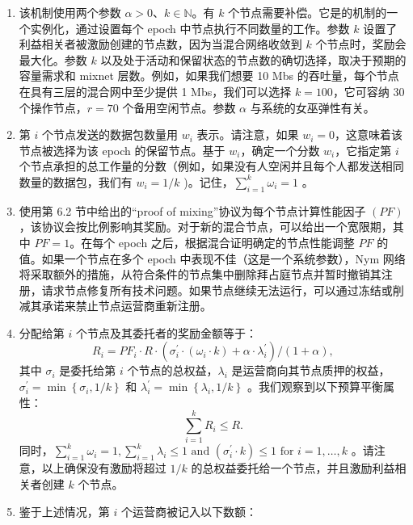 \documentclass{article}
\begin{document}
\begin{enumerate}[1. ]
\item 该机制使用两个参数 $\alpha > 0$、$k \in \mathbb{N}$。有 $k$ 个节点需要补偿。它是\cite{ref10}的机制的一个实例化，通过设置每个 epoch 中节点执行不同数量的工作。参数 $k$ 设置了利益相关者被激励创建的节点数，因为当混合网络收敛到 $k$ 个节点时，奖励会最大化。参数 $k$ 以及处于活动和保留状态的节点数的确切选择，取决于预期的容量需求和 mixnet 层数。例如，如果我们想要 10 Mbs 的吞吐量，每个节点在具有三层的混合网中至少提供 1 Mbs，我们可以选择 $k = 100$，它可容纳 30 个操作节点，$r = 70$ 个备用空闲节点。参数 $\alpha$ 与系统的女巫弹性有关。
\item 第 $i$ 个节点发送的数据包数量用 $w_{i}$ 表示。请注意，如果 $w_{i} = 0$，这意味着该节点被选择为该 epoch 的保留节点。基于 $w_{i}$，确定一个分数 $w_{i}$，它指定第 $i$ 个节点承担的总工作量的分数（例如，如果没有人空闲并且每个人都发送相同数量的数据包，我们有 $w_{i} = 1/k$ )。记住，$\sum_{i=1}^{k} \omega_{i}=1$ 。
\item 使用第 6.2 节中给出的“proof of mixing”协议为每个节点计算性能因子 $(PF )$，该协议会按比例影响其奖励。对于新的混合节点，可以给出一个宽限期，其中 $PF = 1$。在每个 epoch 之后，根据混合证明确定的节点性能调整 $PF$ 的值。如果一个节点在多个 epoch 中表现不佳（这是一个系统参数），Nym 网络将采取额外的措施，从符合条件的节点集中删除拜占庭节点并暂时撤销其注册，请求节点修复所有技术问题。如果节点继续无法运行，可以通过冻结或削减其承诺来禁止节点运营商重新注册。
\item 分配给第 $i$ 个节点及其委托者的奖励金额等于：
\begin{equation}\nonumber
   R_{i}=P F_{i} \cdot R \cdot\left(\sigma_{i}^{\prime} \cdot\left(\omega_{i} \cdot k\right)+\alpha \cdot \lambda_{i}^{\prime}\right) /(1+\alpha),
\end{equation}
   其中 $\sigma_{i}$ 是委托给第 $i$ 个节点的总权益，$\lambda_{i}$ 是运营商向其节点质押的权益，$\sigma_{i}^{\prime}=\min \left\{\sigma_{i}, 1 / k\right\}$ 和 $\lambda_{i}^{\prime}=\min \left\{\lambda_{i}, 1 / k\right\}$ 。我们观察到以下预算平衡属性：
\begin{equation}\nonumber
   \sum_{i=1}^{k} R_{i} \leq R.
\end{equation}
   同时，$\sum_{i=1}^{k} \omega_{i}=1, \sum_{i=1}^{k} \lambda_{i} \leq 1 \text { and }\left(\sigma_{i}^{\prime} \cdot k\right) \leq 1 \text { for } i=1, \ldots, k$ 。请注意，以上确保没有激励将超过 $1/k$ 的总权益委托给一个节点，并且激励利益相关者创建 $k$ 个节点。
\item 鉴于上述情况，第 $i$ 个运营商被记入以下数额：

\end{enumerate}
\end{document}
